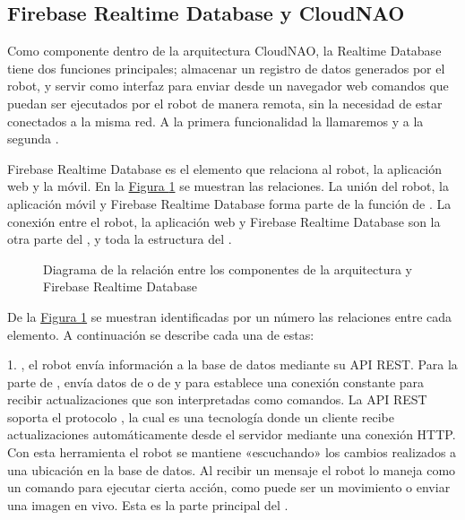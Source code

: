 


\subsection{Firebase Realtime Database y CloudNAO}
\label{\detokenize{chapter_two/desc_cloudnao:firebase-realtime-database-y-cloudnao}}
Como componente dentro de la arquitectura CloudNAO, la Realtime Database tiene
dos funciones principales; almacenar un registro de datos generados por el robot,
y servir como interfaz para enviar desde un navegador web comandos que puedan
ser ejecutados por el robot de manera remota, sin la necesidad de estar
conectados a la misma red. A la primera
funcionalidad la llamaremos  y a la segunda .

Firebase Realtime Database es el elemento que relaciona al robot, la aplicación
web y la móvil. En la \hyperref[\detokenize{chapter_two/desc_cloudnao:rtd-components-diagram}]{Figura \ref{\detokenize{chapter_two/desc_cloudnao:rtd-components-diagram}}} se muestran las relaciones.
La unión del robot, la aplicación móvil y Firebase Realtime Database forma parte de
la función de . La conexión entre el robot, la aplicación web y
Firebase Realtime Database son la otra parte del , y toda la
estructura del .

\begin{figure}[htbp]
\centering
\capstart

\noindent{}
\caption{Diagrama de la relación entre los componentes de la arquitectura y Firebase Realtime Database}\label{\detokenize{chapter_two/desc_cloudnao:rtd-components-diagram}}\end{figure}

De la \hyperref[\detokenize{chapter_two/desc_cloudnao:rtd-components-diagram}]{Figura \ref{\detokenize{chapter_two/desc_cloudnao:rtd-components-diagram}}} se muestran identificadas por un número
las relaciones entre cada elemento. A continuación se describe cada una de estas:

1. , el robot envía información
a la base de datos mediante su API REST.
Para la parte de , envía datos de  o de 
y para  establece una conexión constante para recibir
actualizaciones que son interpretadas como comandos.
La API REST soporta el protocolo
, la cual es una
tecnología donde un cliente recibe actualizaciones automáticamente desde el
servidor mediante una conexión HTTP. Con esta herramienta el robot se mantiene
«escuchando» los cambios realizados a una ubicación en la base de datos. Al
recibir un mensaje el robot lo maneja como un comando para ejecutar cierta
acción, como puede ser un movimiento o enviar una imagen en vivo. Esta es la parte principal del .

